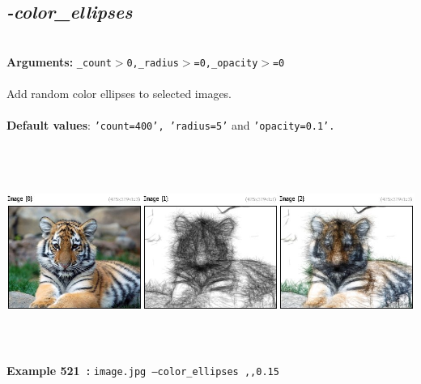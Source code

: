 \documentclass[a4paper,11pt,twoside]{book}
\begin{document}
\subsection{\emph{-color\_ellipses} }\vspace*{-0.5em}
~\\\textbf{Arguments: } 
{\small \texttt{\_count$>$0,\_radius$>$=0,\_opacity$>$=0}}\\~\\
Add random color ellipses to selected images.
~\\~\\\textbf{Default values}: {\small \texttt{'count=400', 'radius=5'} and \texttt{'opacity=0.1'.}}
\begin{center}\includegraphics[keepaspectratio=true,height=7cm,width=\textwidth]{img/gmic_def521.jpg}\\
{\footnotesize \textbf{Example 521~:} \texttt{image.jpg --color\_ellipses ,,0.15}}
\end{center}
\end{document}
